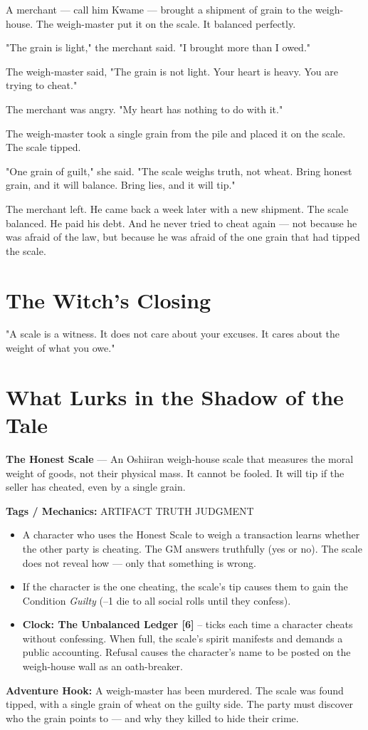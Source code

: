 \documentclass[10pt,twoside]{book}
\newcommand{\tag}[1]{\textsc{#1}}
\begin{document}
A merchant --- call him Kwame --- brought a shipment of grain to the weigh-house. The weigh-master put it on the scale. It balanced perfectly.

"The grain is light," the merchant said. "I brought more than I owed."

The weigh-master said, "The grain is not light. Your heart is heavy. You are trying to cheat."

The merchant was angry. "My heart has nothing to do with it."

The weigh-master took a single grain from the pile and placed it on the scale. The scale tipped.

"One grain of guilt," she said. "The scale weighs truth, not wheat. Bring honest grain, and it will balance. Bring lies, and it will tip."

The merchant left. He came back a week later with a new shipment. The scale balanced. He paid his debt. And he never tried to cheat again --- not because he was afraid of the law, but because he was afraid of the one grain that had tipped the scale.

\section*{The Witch's Closing}
"A scale is a witness. It does not care about your excuses. It cares about the weight of what you owe."

\section*{What Lurks in the Shadow of the Tale}
\begin{infobox}
\textbf{The Honest Scale} --- An Oshiiran weigh-house scale that measures the moral weight of goods, not their physical mass. It cannot be fooled. It will tip if the seller has cheated, even by a single grain.

\textbf{Tags / Mechanics:} \tag{ARTIFACT} \tag{TRUTH} \tag{JUDGMENT}

\begin{itemize}
\item A character who uses the Honest Scale to weigh a transaction learns whether the other party is cheating. The GM answers truthfully (yes or no). The scale does not reveal how --- only that something is wrong.
\item If the character is the one cheating, the scale's tip causes them to gain the Condition \textit{Guilty} (--1 die to all social rolls until they confess).
\item \textbf{Clock: The Unbalanced Ledger [6]} -- ticks each time a character cheats without confessing. When full, the scale's spirit manifests and demands a public accounting. Refusal causes the character's name to be posted on the weigh-house wall as an oath-breaker.
\end{itemize}

\textbf{Adventure Hook:} A weigh-master has been murdered. The scale was found tipped, with a single grain of wheat on the guilty side. The party must discover who the grain points to --- and why they killed to hide their crime.
\end{infobox}
\end{document}
